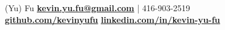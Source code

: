 \documentclass[letterpaper]{kevin-resume} %
\begin{document}


 {(Yu) Fu} { %
	\hspace{6mm}\href{kevin.yu.fu@gmail.com} {\textbf{kevin.yu.fu@gmail.com}} | 416-903-2519 \\ %
	\hspace{6mm}\href{https://github.com/kevinyufu} {\textbf{github.com/kevinyufu}} %
	\hspace{6mm}\href{https://ca.linkedin.com/in/kevin-yu-fu} {\textbf{linkedin.com/in/kevin-yu-fu}}
}

\end{document}
